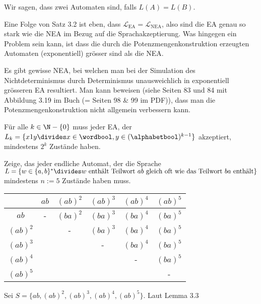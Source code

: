 Wir sagen, dass zwei Automaten  sind, falls $L(A) = L(B)$.

Eine Folge von Satz 3.2 ist eben, dass $\mathcal{L}_{\text{EA}} = \mathcal{L}_{\text{NEA}}$, also sind die EA genau so stark wie die NEA im Bezug auf die Sprachakzeptierung.
Was hingegen ein Problem sein kann, ist dass die durch die Potenzmengenkonstruktion erzeugten Automaten (exponentiell) grösser sind als die NEA.

Es gibt gewisse NEA, bei welchen man bei der Simulation des Nichtdeterminismus durch Determinismus unausweichlich in exponentiell grösseren EA resultiert.
Man kann beweisen (siehe Seiten 83 und 84 mit Abbildung 3.19 im Buch (= Seiten 98 \& 99 im PDF)), dass man die Potenzmengenkonstruktion nicht allgemein verbessern kann.

\inlinelemma Für alle $k \in \N - \{ 0 \}$ muss jeder EA, der $L_k = \{ x1y \divides x \in \wordbool, y \in (\alphabetbool)^{k - 1} \}$ akzeptiert, mindestens $2^k$ Zustände haben.

 Zeige, das jeder endliche Automat,
der die Sprache $L = \{ w \in \{ a , b \}^* \divides w \text{ enthält Teilwort $ab$ gleich oft wie das Teilwort $ba$ enthält} \}$
mindestens $n := 5$ Zustände haben muss.

\begin{table}[h!]
    \begin{center}
        \begin{tabular}[c]{c|ccccc}
                     & $ab$ & $(ab)^2$ & $(ab)^3$ & $(ab)^4$ & $(ab)^5$ \\
            \hline
            $ab$     & -    & $(ba)^2$ & $(ba)^3$ & $(ba)^4$ & $(ba)^5$ \\
            $(ab)^2$ &      & -        & $(ba)^3$ & $(ba)^4$ & $(ba)^5$ \\
            $(ab)^3$ &      &          & -        & $(ba)^4$ & $(ba)^5$ \\
            $(ab)^4$ &      &          &          & -        & $(ba)^5$ \\
            $(ab)^5$ &      &          &          &          & -        \\
        \end{tabular}
    \end{center}
\end{table}
Sei $S = \{ ab, (ab)^2, (ab)^3, (ab)^4, (ab)^5 \}$.
Laut Lemma 3.3
